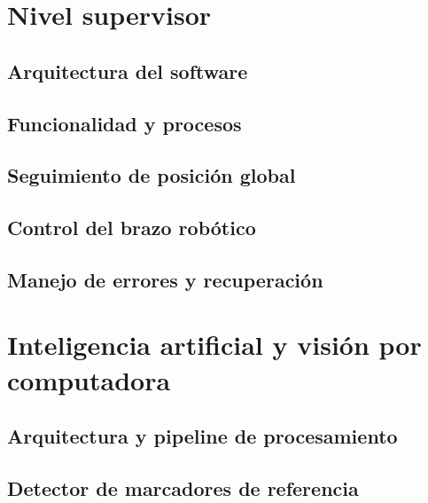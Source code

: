 \documentclass[a4paper,12pt]{report}
\begin{document}
\section{Nivel supervisor}

\subsection{Arquitectura del software}


\subsection{Funcionalidad y procesos}


\subsection{Seguimiento de posición global}


\subsection{Control del brazo robótico}


\subsection{Manejo de errores y recuperación}


\section{Inteligencia artificial y visión por computadora}

\subsection{Arquitectura y pipeline de procesamiento}


\subsection{Detector de marcadores de referencia}




\end{document}
